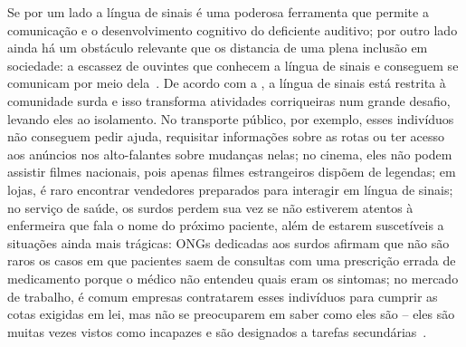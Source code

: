 

Se por um lado a língua de sinais é uma poderosa ferramenta que permite a comunicação e o desenvolvimento cognitivo do deficiente auditivo; por outro lado ainda há um obstáculo relevante que os distancia de uma plena inclusão em sociedade: a escassez de ouvintes que conhecem a língua de sinais e conseguem se comunicam por meio dela~\cite{bragg-2019-slr-interdisciplinary}. De acordo com a , a língua de sinais está restrita à comunidade surda e isso transforma atividades corriqueiras num grande desafio, levando eles ao isolamento. No transporte público, por exemplo, esses indivíduos não conseguem pedir ajuda, requisitar informações sobre as rotas ou ter acesso aos anúncios nos alto-falantes sobre mudanças nelas; no cinema, eles não podem assistir filmes nacionais, pois apenas filmes estrangeiros dispõem de legendas; em lojas, é raro encontrar vendedores preparados para interagir em língua de sinais; no serviço de saúde, os surdos perdem sua vez se não estiverem atentos à enfermeira que fala o nome do próximo paciente, além de estarem suscetíveis a situações ainda mais trágicas: ONGs dedicadas aos surdos afirmam que não são raros os casos em que pacientes saem de consultas com uma prescrição errada de medicamento porque o médico não entendeu quais eram os sintomas; no mercado de trabalho, é comum empresas contratarem esses indivíduos para cumprir as cotas exigidas em lei, mas não se preocuparem em saber como eles são -- eles são muitas vezes vistos como incapazes e são designados a tarefas secundárias~\cite{senado-2019-baixo-alcance-lingua-sinais}.


